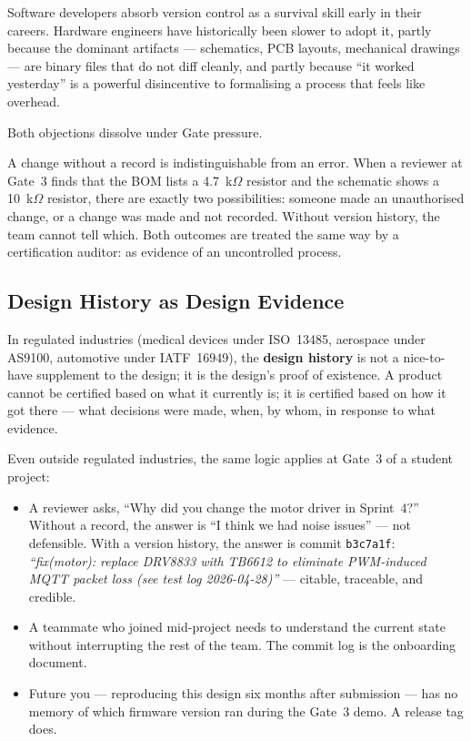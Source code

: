 Software developers absorb version control as a survival skill early in their careers.
Hardware engineers have historically been slower to adopt it, partly because the dominant
artifacts --- schematics, PCB layouts, mechanical drawings --- are binary files that do not
diff cleanly, and partly because ``it worked yesterday'' is a powerful disincentive to
formalising a process that feels like overhead.

Both objections dissolve under Gate pressure.

A change without a record is indistinguishable
from an error.
When a reviewer at Gate~3 finds that the BOM lists a 4.7~k$\Omega$ resistor and the
schematic shows a 10~k$\Omega$ resistor, there are exactly two possibilities: someone made
an unauthorised change, or a change was made and not recorded.
Without version history, the team cannot tell which.
Both outcomes are treated the same way by a certification auditor: as evidence of an
uncontrolled process.

\subsection{Design History as Design Evidence}
\label{subsec:ch13-history-is-evidence}

In regulated industries (medical devices under ISO~13485,
aerospace under AS9100, automotive under IATF~16949), the \textbf{design history} is not
a nice-to-have supplement to the design; it is the design's proof of existence.
A product cannot be certified based on what it currently is; it is certified based on how
it got there --- what decisions were made, when, by whom, in response to what evidence.

Even outside regulated industries, the same logic applies at Gate~3 of a student project:
\begin{itemize}
  \item A reviewer asks, ``Why did you change the motor driver in Sprint~4?''
        Without a record, the answer is ``I think we had noise issues'' --- not defensible.
        With a version history, the answer is commit \texttt{b3c7a1f}: \emph{``fix(motor):
        replace DRV8833 with TB6612 to eliminate PWM-induced MQTT packet loss (see test log
        2026-04-28)''} --- citable, traceable, and credible.
  \item A teammate who joined mid-project needs to understand the current state without
        interrupting the rest of the team.
        The commit log is the onboarding document.
  \item Future you --- reproducing this design six months after submission --- has no memory
        of which firmware version ran during the Gate~3 demo.
        A release tag does.
\end{itemize}


